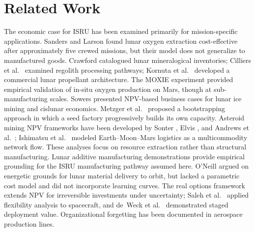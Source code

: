 \section{Related Work}
\label{sec:related}

The economic case for ISRU has been examined primarily for mission-specific applications. Sanders and Larson \cite{sanders2015} found lunar oxygen extraction cost-effective after approximately five crewed missions, but their model does not generalize to manufactured goods. Crawford \cite{crawford2015} catalogued lunar mineralogical inventories; Cilliers et al.\ \cite{cilliers2023} examined regolith processing pathways; Kornuta et al.\ \cite{kornuta2019} developed a commercial lunar propellant architecture. The MOXIE experiment \cite{hecht2021} provided empirical validation of in-situ oxygen production on Mars, though at sub-manufacturing scales. Sowers \cite{sowers2021,sowers2023} presented NPV-based business cases for lunar ice mining and cislunar economics. Metzger et al.\ \cite{metzger2013} proposed a bootstrapping approach in which a seed factory progressively builds its own capacity. Asteroid mining NPV frameworks have been developed by Sonter \cite{sonter1997}, Elvis \cite{elvis2012}, and Andrews et al.\ \cite{andrews2015}; Ishimatsu et al.\ \cite{ishimatsu2016} modeled Earth--Moon--Mars logistics as a multicommodity network flow. These analyses focus on resource extraction rather than structural manufacturing. Lunar additive manufacturing demonstrations \cite{werkheiser2015,cesaretti2014} provide empirical grounding for the ISRU manufacturing pathway assumed here. O'Neill \cite{oneill1974,oneill1976} argued on energetic grounds for lunar material delivery to orbit, but lacked a parametric cost model and did not incorporate learning curves. The real options framework \cite{dixit1994} extends NPV for irreversible investments under uncertainty; Saleh et al.\ \cite{saleh2003} applied flexibility analysis to spacecraft, and de~Weck et al.\ \cite{deweck2004} demonstrated staged deployment value. Organizational forgetting \cite{benkard2000,thompson2012} has been documented in aerospace production lines.

